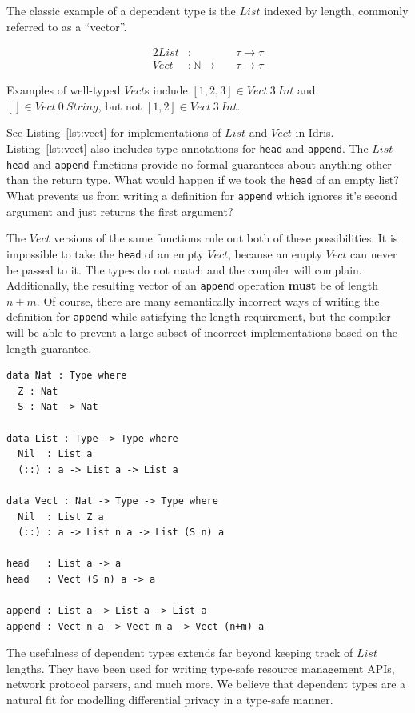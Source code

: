 \documentclass[12pt]{article}
\begin{document}
The classic example of a dependent type is the $List$ indexed by length, commonly referred to as a ``vector''.

\begin{alignat*}{2}
  List &:                        &&\tau \rightarrow \tau \\
  Vect &: \mathbb{N} \rightarrow &&\tau \rightarrow \tau
\end{alignat*}


Examples of well-typed $Vect$s include $[1,2,3]\in Vect\ 3\ Int$ and $[]\in Vect\ 0\ String$, but not $[1,2]\in Vect\ 3\ Int$.

See Listing~\ref{lst:vect} for implementations of $List$ and $Vect$ in Idris.
Listing~\ref{lst:vect} also includes type annotations for \texttt{head} and \texttt{append}.
The $List$ \texttt{head} and \texttt{append} functions provide no formal guarantees about anything other than the return type.
What would happen if we took the \texttt{head} of an empty list?
What prevents us from writing a definition for \texttt{append} which ignores it's second argument and just returns the first argument?

The $Vect$ versions of the same functions rule out both of these possibilities.
It is impossible to take the \texttt{head} of an empty $Vect$, because an empty $Vect$ can never be passed to it.
The types do not match and the compiler will complain.
Additionally, the resulting vector of an \texttt{append} operation \textbf{must} be of length $n+m$.
Of course, there are many semantically incorrect ways of writing the definition for \texttt{append} while satisfying the length requirement, but the compiler will be able to prevent a large subset of incorrect implementations based on the length guarantee.

\begin{lstlisting}[caption=List and Vect,label={lst:vect}]
data Nat : Type where
  Z : Nat
  S : Nat -> Nat

data List : Type -> Type where
  Nil  : List a
  (::) : a -> List a -> List a

data Vect : Nat -> Type -> Type where
  Nil  : List Z a
  (::) : a -> List n a -> List (S n) a

head   : List a -> a
head   : Vect (S n) a -> a

append : List a -> List a -> List a
append : Vect n a -> Vect m a -> Vect (n+m) a
\end{lstlisting}

The usefulness of dependent types extends far beyond keeping track of $List$ lengths.
They have been used for writing type-safe resource management APIs, network protocol parsers, and much more\cite{conf/plpv/Brady11}.
We believe that dependent types are a natural fit for modelling differential privacy in a type-safe manner.
\end{document}
